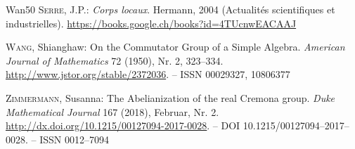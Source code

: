 \documentclass[12pt, oneside, reqno]{amsart}
\begin{document}
\begin{thebibliography}{Wan50}
\textsc{Serre}, J.P.:
\newblock \emph{Corps locaux}.
\newblock Hermann, 2004 (Actualit{\'e}s scientifiques et industrielles).
\newblock \url{https://books.google.ch/books?id=4TUcnwEACAAJ}

\textsc{Wang}, Shianghaw:
\newblock On the Commutator Group of a Simple Algebra.
\emph{American Journal of Mathematics} 72 (1950), Nr. 2, 323--334.
\newblock \url{http://www.jstor.org/stable/2372036}. --
\newblock ISSN 00029327, 10806377

\textsc{Zimmermann}, Susanna:
\newblock The Abelianization of the real Cremona group.
\emph{Duke Mathematical Journal} 167 (2018), Februar, Nr. 2.
\newblock \url{http://dx.doi.org/10.1215/00127094-2017-0028}. --
\newblock DOI 10.1215/00127094--2017--0028. --
\newblock ISSN 0012--7094

\end{thebibliography}
\end{document}
